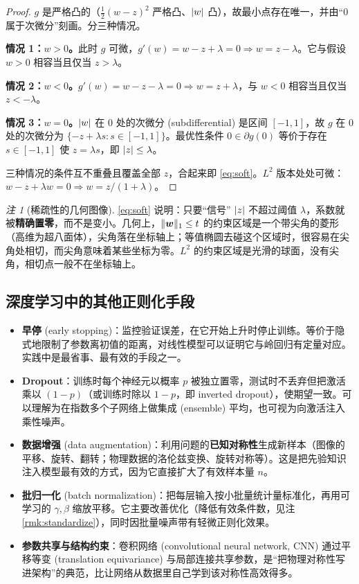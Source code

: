 \documentclass[UTF8,a4paper,11pt]{ctexart}
\theoremstyle{definition}
\theoremstyle{plain}
\theoremstyle{remark}
\newtheorem{remark}[definition]{注}
\DeclarePairedDelimiter{\norm}{\lVert}{\rVert}
\DeclarePairedDelimiter{\abs}{\lvert}{\rvert}
\newcommand{\eng}[1]{\textup{(#1)}}
\begin{document}
\begin{proof}
$g$ 是严格凸的（$\tfrac12(w-z)^2$ 严格凸、$\abs{w}$ 凸），故最小点存在唯一，并由“$0$ 属于次微分”刻画。分三种情况。

\textbf{情况 1：$w>0$。}此时 $g$ 可微，$g'(w)=w-z+\lambda=0\Rightarrow w=z-\lambda$。它与假设 $w>0$ 相容当且仅当 $z>\lambda$。

\textbf{情况 2：$w<0$。}$g'(w)=w-z-\lambda=0\Rightarrow w=z+\lambda$，与 $w<0$ 相容当且仅当 $z<-\lambda$。

\textbf{情况 3：$w=0$。}$\abs{w}$ 在 $0$ 处的次微分 \eng{subdifferential} 是区间 $[-1,1]$，故 $g$ 在 $0$ 处的次微分为 $\{-z+\lambda s:s\in[-1,1]\}$。最优性条件 $0\in\partial g(0)$ 等价于存在 $s\in[-1,1]$ 使 $z=\lambda s$，即 $\abs{z}\le\lambda$。

三种情况的条件互不重叠且覆盖全部 $z$，合起来即 \eqref{eq:soft}。$L^2$ 版本处处可微：$w-z+\lambda w=0\Rightarrow w=z/(1+\lambda)$。
\end{proof}

\begin{remark}[稀疏性的几何图像]
\eqref{eq:soft} 说明：只要“信号” $\abs{z}$ 不超过阈值 $\lambda$，系数就被\textbf{精确置零}，而不是变小。几何上，$\norm{\bm{w}}_1\le t$ 的约束区域是一个带尖角的菱形（高维为超八面体），尖角落在坐标轴上；等值椭圆去碰这个区域时，很容易在尖角处相切，而尖角意味着某些坐标为零。$L^2$ 的约束区域是光滑的球面，没有尖角，相切点一般不在坐标轴上。
\end{remark}

\subsection{深度学习中的其他正则化手段}

\begin{itemize}
  \item \textbf{早停} \eng{early stopping}：监控验证误差，在它开始上升时停止训练。等价于隐式地限制了参数离初值的距离，对线性模型可以证明它与岭回归有定量对应。实践中是最省事、最有效的手段之一。
  \item \textbf{Dropout}：训练时每个神经元以概率 $p$ 被独立置零，测试时不丢弃但把激活乘以 $(1-p)$（或训练时除以 $1-p$，即 inverted dropout），使期望一致。可以理解为在指数多个子网络上做集成 \eng{ensemble} 平均，也可视为向激活注入乘性噪声。
  \item \textbf{数据增强} \eng{data augmentation}：利用问题的\textbf{已知对称性}生成新样本（图像的平移、旋转、翻转；物理数据的洛伦兹变换、旋转对称等）。这是把先验知识注入模型最有效的方式，因为它直接扩大了有效样本量 $n$。
  \item \textbf{批归一化} \eng{batch normalization}：把每层输入按小批量统计量标准化，再用可学习的 $\gamma,\beta$ 缩放平移。它主要改善优化（降低有效条件数，见注 \ref{rmk:standardize}），同时因批量噪声带有轻微正则化效果。
  \item \textbf{参数共享与结构约束}：卷积网络 \eng{convolutional neural network, CNN} 通过平移等变 \eng{translation equivariance} 与局部连接共享参数，是“把物理对称性写进架构”的典范，比让网络从数据里自己学到该对称性高效得多。
\end{itemize}
\end{document}
